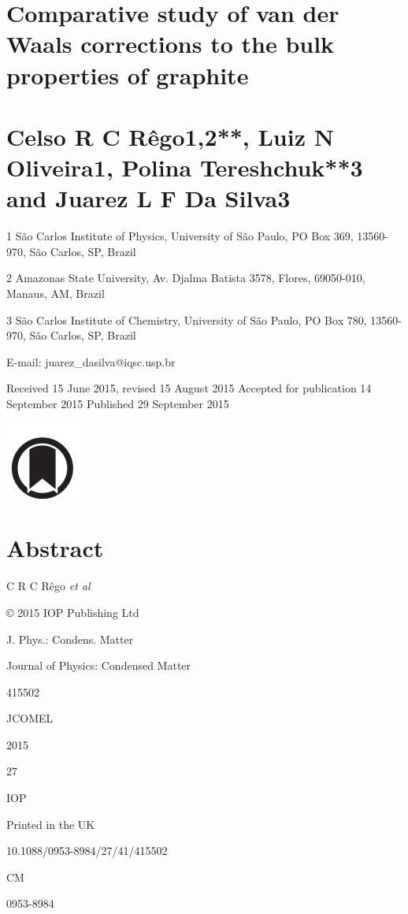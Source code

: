 \documentclass{article}
\begin{document}
\section{\textbf{Comparative study of van der Waals corrections to the bulk properties of graphite}}

\section{\textbf{Celso R C Rêgo}1,2**, Luiz N Oliveira\textbf{1}, Polina Tereshchuk**3 \textbf{and Juarez L F Da Silva}3}

1 São Carlos Institute of Physics, University of São Paulo, PO Box 369, 13560-970, São Carlos, SP, Brazil

2 Amazonas State University, Av. Djalma Batista 3578, Flores, 69050-010, Manaus, AM, Brazil

3 São Carlos Institute of Chemistry, University of São Paulo, PO Box 780, 13560-970, São Carlos, SP, Brazil

E-mail: juarez\_dasilva@iqsc.usp.br

Received 15 June 2015, revised 15 August 2015 Accepted for publication 14 September 2015 Published 29 September 2015


\includegraphics{_page_2_Picture_10.png}


\section{\textbf{Abstract}}

C R C Rêgo \textit{et al}

© 2015 IOP Publishing Ltd

J. Phys.: Condens. Matter

Journal of Physics: Condensed Matter

415502

JCOMEL

2015

27

IOP

Printed in the UK

10.1088/0953-8984/27/41/415502

CM

0953-8984
\end{document}
